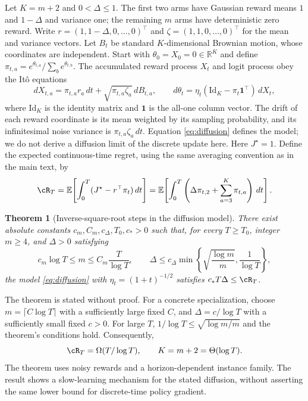 \documentclass[11pt,twoside]{article}
\newcommand{\E}{\mathbb E}
\newcommand{\R}{\mathbb R}
\newtheorem{theorem}{Theorem}[section]
\theoremstyle{definition}
\theoremstyle{remark}
\begin{document}
Let $K=m+2$ and $0<\Delta\le1$. The first two arms have Gaussian reward means $1$ and
$1-\Delta$ and variance one; the remaining $m$ arms have deterministic
zero reward. Write $r=(1,1-\Delta,0,\ldots,0)^\top$ and
$\zeta=(1,1,0,\ldots,0)^\top$ for the mean and variance vectors.
Let $B_t$ be standard $K$-dimensional Brownian motion, whose coordinates
are independent. Start with $\theta_0=X_0=0\in\R^K$ and define
$\pi_{t,a}=e^{\theta_{t,a}}/\sum_b e^{\theta_{t,b}}$.
The accumulated reward process $X_t$ and logit process obey the It\^o equations
\begin{equation}
 dX_{t,a}=\pi_{t,a}r_a\,dt+\sqrt{\pi_{t,a}\zeta_a}\,dB_{t,a},
 \qquad
 d\theta_t=\eta_t(\mathrm{Id}_K-\pi_t\mathbf1^\top)\,dX_t,
 \label{eq:diffusion}
\end{equation}
where $\mathrm{Id}_K$ is the identity matrix and $\mathbf1$ is the all-one
column vector. The drift of each reward coordinate is its mean weighted by
its sampling probability, and its infinitesimal noise variance is
$\pi_{t,a}\zeta_a\,dt$. Equation \cref{eq:diffusion} defines the model;
we do not derive a diffusion limit of the discrete update here.
Here $J^\star=1$. Define the expected continuous-time regret, using the
same averaging convention as in the main text, by
\[
 \cR_T=\E\!\left[\int_0^T(J^\star-r^\top\pi_t)\,dt\right]
 =\E\!\left[\int_0^T\left(\Delta\pi_{t,2}+\sum_{a=3}^K\pi_{t,a}\right)\,dt\right].
\]

\begin{theorem}[Inverse-square-root steps in the diffusion model]
\label{thm:diffusion}
There exist absolute constants $c_m,C_m,c_\Delta,T_0,c_*>0$ such that,
for every $T\ge T_0$, integer $m\ge4$, and $\Delta>0$ satisfying
\[
 c_m\log T\le m\le C_m\frac{T}{\log T},\qquad
 \Delta\le c_\Delta\min\left\{\sqrt{\frac{\log m}{m}},\frac1{\log T}\right\},
\]
the model \cref{eq:diffusion} with $\eta_t=(1+t)^{-1/2}$ satisfies
$c_*T\Delta\le\cR_T$.
\end{theorem}

The theorem is stated without proof. For a concrete specialization,
choose $m=\lceil C\log T\rceil$ with a sufficiently large fixed $C$, and
$\Delta=c/\log T$ with a sufficiently small fixed $c>0$. For large $T$,
$1/\log T\le\sqrt{\log m/m}$ and the theorem's conditions hold.
Consequently,
\[
 \cR_T=\Omega(T/\log T),\qquad K=m+2=\Theta(\log T).
\]
The theorem uses noisy rewards and a horizon-dependent instance family.
The result shows a slow-learning mechanism for the stated diffusion, without
asserting the same lower bound for discrete-time policy gradient.
\end{document}
